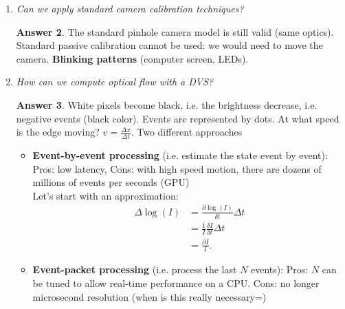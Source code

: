 \documentclass[a4paper,12 pt]{article}
\theoremstyle{definition}
\theoremstyle{remark}
\theoremstyle{definition}
\theoremstyle{definition}
\theoremstyle{definition}
\theoremstyle{definition}
\theoremstyle{remark}
\theoremstyle{remark}
\theoremstyle{definition}
\theoremstyle{definition}
\newtheorem*{answer}{Answer}
\begin{document}
\begin{enumerate}
\begin{answer}
\end{answer}
\item \textit{ Can we apply standard camera calibration techniques? }
\begin{answer}
The standard pinhole camera model is still valid (same optics). Standard passive calibration cannot be used: we would need to move the camera. \textbf{Blinking patterns} (computer screen, LEDs).
\end{answer}
\item \textit{How can we compute optical flow with a DVS?}
\begin{answer}
White pixels become black, i.e. the brightness decrease, i.e. negative events (black color). Events are represented by dots. At what speed is the edge moving? $v=\frac{\Delta x}{\Delta t}$. 
Two different approaches
\begin{itemize}
\item \textbf{Event-by-event processing} (i.e. estimate the state event by event): Pros: low latency, Cons: with high speed motion, there are dozens of millions of events per seconds (GPU)\\
Let's start with an approximation:
\begin{equation}
\begin{split}
\Delta \log(I)&=\frac{\partial \log(I)}{\delta t}\Delta t\\
&=\frac{1}{I}\frac{\delta I}{\delta t}\Delta t\\
&=\frac{\partial I}{I}.
\end{split}
\end{equation}


\item \textbf{Event-packet processing} (i.e. process the last $N$ events): Pros: $N$ can be tuned to allow real-time performance on a CPU. Cons: no longer microsecond resolution (when is this really necessary=)
\end{itemize}



\end{answer}
\end{enumerate}
\end{document}
